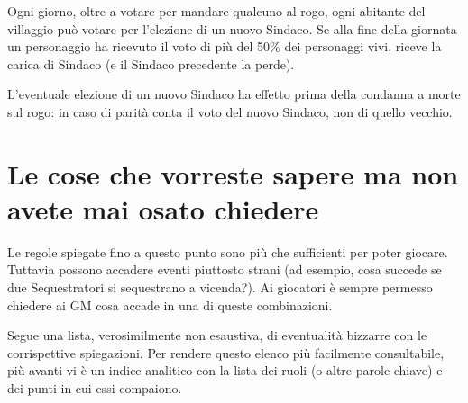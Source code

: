 \documentclass[a4paper,10pt]{article}
\begin{document}
Ogni giorno, oltre a votare per mandare qualcuno al rogo, ogni abitante del
villaggio può votare per l'elezione di un nuovo Sindaco. Se alla fine della
giornata un personaggio ha ricevuto il voto di più del 50\% dei personaggi vivi,
riceve la carica di Sindaco (e il Sindaco precedente la perde).

L'eventuale elezione di un nuovo Sindaco ha effetto prima della condanna a morte
sul rogo: in caso di parità conta il voto del nuovo Sindaco, non di quello
vecchio.


\pagebreak
\section{Le cose che vorreste sapere ma non avete mai osato chiedere}
\label{faq}

Le regole spiegate fino a questo punto sono più che sufficienti per poter
giocare. Tuttavia possono accadere eventi piuttosto strani (ad esempio, cosa
succede se due Sequestratori si sequestrano a vicenda?). Ai giocatori è sempre permesso
chiedere ai GM cosa accade in una di queste combinazioni.

Segue una lista, verosimilmente non esaustiva, di eventualità bizzarre con le
corrispettive spiegazioni.
Per rendere questo elenco più facilmente consultabile, più avanti vi è un indice
analitico con la lista dei ruoli (o altre parole chiave) e dei punti in cui essi
compaiono.
\end{document}
